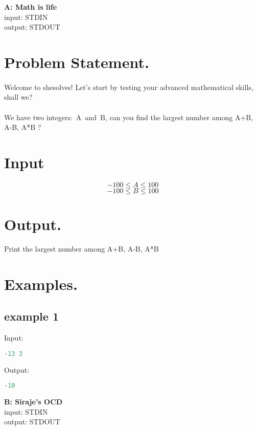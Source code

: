 \documentclass[10pt]{article}
\begin{document}
\begin{center}
    \Huge { \textbf{A: Math is life}}\\
    \normalsize  { input:  STDIN}\\
    \normalsize{    output: STDOUT}
\end{center}
\section{Problem Statement.}
\paragraph{}
Welcome to shesolves!
Let’s start by testing your advanced mathematical skills, shall we?
\paragraph{}
We have two integers: A and B, can you find the largest number among A+B, A-B, A*B ?
\paragraph{}
\section{Input}
$$ -100\le A \le 100 $$
$$ -100\le B \le 100 $$
\section{Output.}
Print the largest number among A+B, A-B, A*B
\section{Examples.}
\subsection{example 1}
Input:
\begin{lstlisting}[language=Python]
-13 3
\end{lstlisting}
Output:
\begin{lstlisting}[language=Python]
-10
\end{lstlisting}
\newpage
\begin{center}
    \Huge{    \textbf{B: Siraje's OCD}}\\
        \normalsize  { input:  STDIN}\\
    \normalsize{    output: STDOUT}
\end{center}
\end{document}
